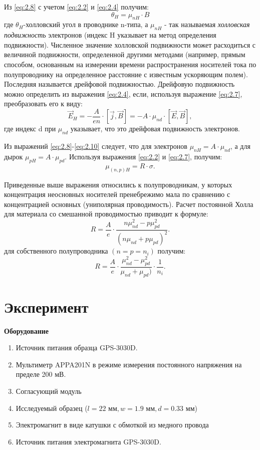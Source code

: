 Из \ref{eq:2.8} с учетом \ref{eq:2.2} и \ref{eq:2.4} получим:
\begin{equation}
\label{eq:2.9}
	\theta_H = \mu_{nH} \cdot B
\end{equation}
где $\theta_H$-холловский угол в проводнике n-типа, а $\mu_{nH}$ - так называемая \textit{холловская подвижность} электронов (индекс H указывает на метод определения подвижности). Численное значение холловской подвижности может расходиться с величиной подвижности, определенной другими методами (например, прямым способом, основанным на измерении времени распространения носителей тока по полупроводнику на определенное расстояние с известным ускоряющим полем). Последняя называется дрейфовой подвижностью. Дрейфовую подвижность можно определить из выражения \ref{eq:2.4}, если, используя выражение \ref{eq:2.7}, преобразовать его к виду:
\begin{equation}
\label{eq:2.10}
	\vec E_H = -\frac{A}{en}\cdot[\vec j, \vec B]=-A\cdot \mu_{nd} \cdot [\vec E,\vec B],
\end{equation}
где индекс d при $\mu_{nd}$ указывает, что это дрейфовая подвижность электронов.

Из выражений \eqref{eq:2.8}-\eqref{eq:2.10} следует, что для электронов $\mu_{nH}=A\cdot \mu_{nd}$, а для дырок $\mu_{pH}=A\cdot \mu_{pd}$. Используя выражения \eqref{eq:2.2} и \eqref{eq:2.7}, получим:
\begin{equation}
\label{eq:2.11}
	\mu_{(n,p)H}=R\cdot \sigma.
\end{equation}

Приведенные выше выражения относились к полупроводникам, у которых концентрация неосновных носителей пренебрежимо мала по сравнению с концентрацией основных (униполярная проводимость). Расчет постоянной Холла для материала со смешанной проводимостью приводит к формуле:
\begin{equation}
\label{eq:2.12}
	R= \frac{A}{e}\cdot \frac{n\mu^2_{nd}-p\mu^2_{pd}}{(n\mu_{nd}+p\mu_{pd})^2}.
\end{equation}
для собственного полупроводника $(n=p=n_i)$ получим:
\begin{equation}
\label{eq:2.12}
	R= \frac{A}{e}\cdot \frac{\mu^2_{nd}-\mu^2_{pd}}{\mu_{nd}+\mu_{pd})}\cdot \frac{1}{n_i}.
\end{equation}

\newpage
\section*{Эксперимент}
\textbf{Оборудование}
\begin{enumerate}
\item Источник питания образца GPS-3030D.
\item Мультиметр APPA201N в режиме измерения постоянного напряжения на пределе 200 мВ.
\item Согласующий модуль
\item Исследуемый образец ($l = 22 \text{ мм},w = 1.9 \text{ мм}, d = 0.33 \text{ мм}$)
\item Электромагнит в виде катушки с обмоткой из медного провода
\item Источник питания электромагнита GPS-3030D.
\end{enumerate}

